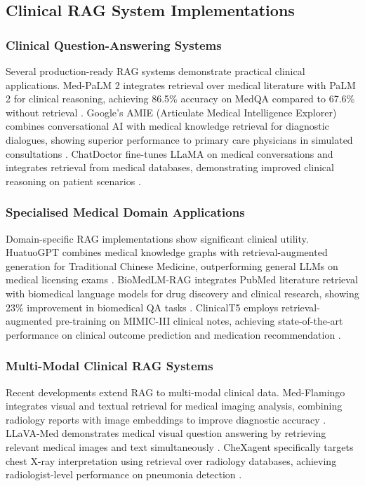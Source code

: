 \subsection{Clinical RAG System Implementations}

\subsubsection{Clinical Question-Answering Systems}
Several production-ready RAG systems demonstrate practical clinical applications. Med-PaLM 2 integrates retrieval over medical literature with PaLM 2 for clinical reasoning, achieving 86.5\% accuracy on MedQA compared to 67.6\% without retrieval \citep{singhal2024medpalm2}. Google's AMIE (Articulate Medical Intelligence Explorer) combines conversational AI with medical knowledge retrieval for diagnostic dialogues, showing superior performance to primary care physicians in simulated consultations \citep{tu2024amie}. ChatDoctor fine-tunes LLaMA on medical conversations and integrates retrieval from medical databases, demonstrating improved clinical reasoning on patient scenarios \citep{li2023chatdoctor}.

\subsubsection{Specialised Medical Domain Applications}
Domain-specific RAG implementations show significant clinical utility. HuatuoGPT combines medical knowledge graphs with retrieval-augmented generation for Traditional Chinese Medicine, outperforming general LLMs on medical licensing exams \citep{zhang2023huatuogpt}. BioMedLM-RAG integrates PubMed literature retrieval with biomedical language models for drug discovery and clinical research, showing 23\% improvement in biomedical QA tasks \citep{bolton2024biomedlm}. ClinicalT5 employs retrieval-augmented pre-training on MIMIC-III clinical notes, achieving state-of-the-art performance on clinical outcome prediction and medication recommendation \citep{lehman2023clinicalt5}.

\subsubsection{Multi-Modal Clinical RAG Systems}
Recent developments extend RAG to multi-modal clinical data. Med-Flamingo integrates visual and textual retrieval for medical imaging analysis, combining radiology reports with image embeddings to improve diagnostic accuracy \citep{moor2023medflamingo}. LLaVA-Med demonstrates medical visual question answering by retrieving relevant medical images and text simultaneously \citep{li2023llavamed}. CheXagent specifically targets chest X-ray interpretation using retrieval over radiology databases, achieving radiologist-level performance on pneumonia detection \citep{chen2024chexagent}.

